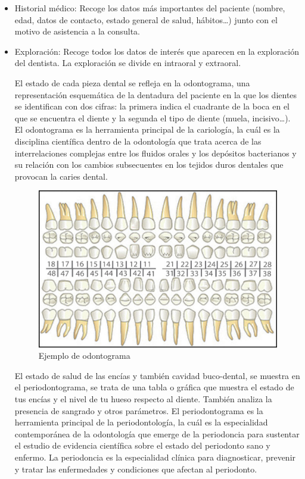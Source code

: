 \begin{itemize}
\item Historial médico: Recoge los datos más importantes del paciente (nombre, edad, datos de contacto, estado general de salud, hábitos…) junto con el motivo de asistencia a la consulta.
            
\item Exploración: Recoge todos los datos de interés que aparecen en la exploración del dentista. La exploración se divide en intraoral y extraoral.
            
      El estado de cada pieza dental se refleja en la odontograma, una representación esquemática de la dentadura del paciente en la que los dientes se identifican con dos cifras: la primera indica el cuadrante de la boca en el que se encuentra el diente y la segunda el tipo de diente (muela, incisivo…). El odontograma es la herramienta principal de la cariología, la cuál es la disciplina científica dentro de la odontología que trata acerca de las interrelaciones complejas entre los fluidos orales y los depósitos bacterianos y su relación con los cambios subsecuentes en los tejidos duros dentales que provocan la caries dental.
            
      \begin{figure}[H]
      \centering
      \centerline{\includegraphics[width=12cm, keepaspectratio]{pictures/picture15.jpg}}
      \caption{Ejemplo de odontograma}
      \end{figure}
            
      El estado de salud de las encías y también cavidad buco-dental, se muestra en el periodontograma, se trata de una tabla o gráfica que muestra el estado de tus encías y el nivel de tu hueso respecto al diente. También analiza la presencia de sangrado y otros parámetros. El periodontograma es la herramienta principal de la periodontología, la cuál es la especialidad contemporánea de la odontología que emerge de la periodoncia para sustentar el estudio de evidencia científica sobre el estado del periodonto sano y enfermo. La periodoncia es la especialidad clínica para diagnosticar, prevenir y tratar las enfermedades y condiciones que afectan al periodonto.
            

\end{itemize}
